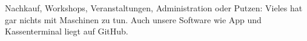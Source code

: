 Nachkauf, Workshops, Veranstaltungen, Administration oder Putzen: Vieles
hat gar nichts mit Maschinen zu tun. Auch unsere Software wie App und
Kassenterminal liegt auf GitHub.
